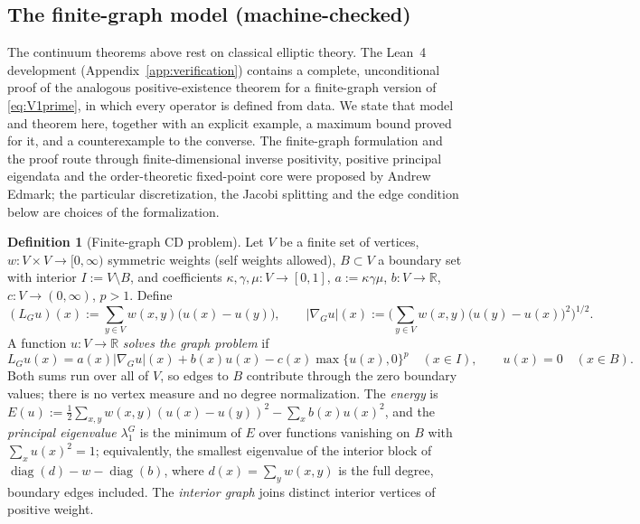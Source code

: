 \documentclass[11pt]{article}
\theoremstyle{plain}
\theoremstyle{definition}
\newtheorem{definition}[theorem]{Definition}
\theoremstyle{remark}
\newcommand{\R}{\mathbb{R}}
\begin{document}
\subsection{The finite-graph model (machine-checked)}\label{sec:graph}
The continuum theorems above rest on classical elliptic theory. The Lean~4 development (Appendix~\ref{app:verification}) contains a complete, unconditional proof of the analogous positive-existence theorem for a finite-graph version of \eqref{eq:V1prime}, in which every operator is defined from data. We state that model and theorem here, together with an explicit example, a maximum bound proved for it, and a counterexample to the converse. The finite-graph formulation and the proof route through finite-dimensional inverse positivity, positive principal eigendata and the order-theoretic fixed-point core were proposed by Andrew Edmark; the particular discretization, the Jacobi splitting and the edge condition below are choices of the formalization.

\begin{definition}[Finite-graph CD problem]\label{def:graphModel}
Let \(V\) be a finite set of vertices, \(w:V\times V\to[0,\infty)\) symmetric weights (self weights allowed), \(B\subset V\) a boundary set with interior \(I:=V\setminus B\), and coefficients \(\kappa,\gamma,\mu:V\to[0,1]\), \(a:=\kappa\gamma\mu\), \(b:V\to\R\), \(c:V\to(0,\infty)\), \(p>1\). Define
\[
(L_Gu)(x):=\sum_{y\in V}w(x,y)\big(u(x)-u(y)\big),\qquad
|\nabla_G u|(x):=\Big(\sum_{y\in V}w(x,y)\big(u(y)-u(x)\big)^2\Big)^{1/2}.
\]
A function \(u:V\to\R\) \emph{solves the graph problem} if
\[
L_Gu(x)=a(x)|\nabla_Gu|(x)+b(x)u(x)-c(x)\max\{u(x),0\}^p\quad(x\in I),\qquad u(x)=0\quad(x\in B).
\]
Both sums run over all of \(V\), so edges to \(B\) contribute through the zero boundary values; there is no vertex measure and no degree normalization. The \emph{energy} is \(E(u):=\tfrac12\sum_{x,y}w(x,y)(u(x)-u(y))^2-\sum_xb(x)u(x)^2\), and the \emph{principal eigenvalue} \(\lambda_1^G\) is the minimum of \(E\) over functions vanishing on \(B\) with \(\sum_xu(x)^2=1\); equivalently, the smallest eigenvalue of the interior block of \(\operatorname{diag}(d)-w-\operatorname{diag}(b)\), where \(d(x)=\sum_yw(x,y)\) is the full degree, boundary edges included. The \emph{interior graph} joins distinct interior vertices of positive weight.
\end{definition}
\end{document}
